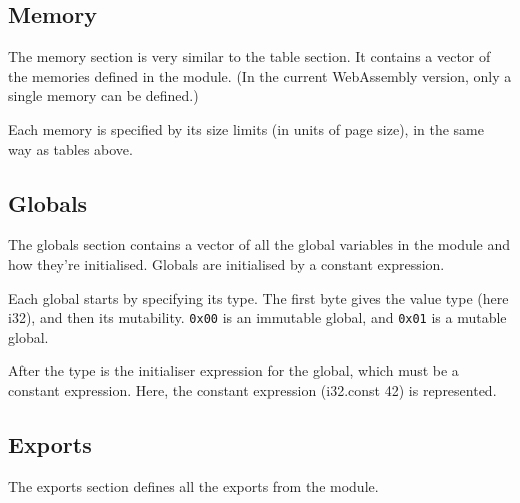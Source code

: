 \documentclass[10pt,a4paper]{article}
\newcommand{\hex}[1]{\texttt{#1}}
\newcommand{\instr}[1]{\textsf{#1}}
\begin{document}



\subsection*{Memory}

The memory section is very similar to the table section. It contains a vector of the memories defined in the module. (In the current WebAssembly version, only a single memory can be defined.)



Each memory is specified by its size limits (in units of page size), in the same way as tables above.




\subsection*{Globals}

The globals section contains a vector of all the global variables in the module and how they're initialised. Globals are initialised by a constant expression.



Each global starts by specifying its type. The first byte gives the value type (here \instr{i32}), and then its mutability. \hex{0x00} is an immutable global, and \hex{0x01} is a mutable global.



After the type is the initialiser expression for the global, which must be a constant expression. Here, the constant expression \instr{(i32.const 42)} is represented.




\subsection*{Exports}

The exports section defines all the exports from the module.
\end{document}
